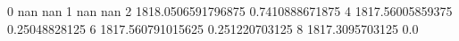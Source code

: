 0 nan nan
1 nan nan
2 1818.0506591796875 0.7410888671875
4 1817.56005859375 0.25048828125
6 1817.560791015625 0.251220703125
8 1817.3095703125 0.0
